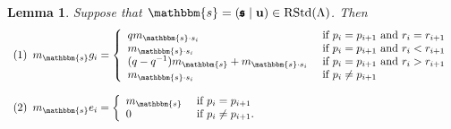 \documentclass[10pt,a4,twoside,hidelinks,rm]{article}
\newcommand\es{\mathbbm{s}}
\newcommand\bu{\mathbf{u}}
\newcommand{\Bs}{\pmb{\mathfrak{s}}}
\newcommand{\rstd}{{\rm RStd}}
\theoremstyle{plain}
\newtheorem{lem}[teo]{Lemma}
\begin{document}
\begin{lem}\label{descr2A}
  Suppose that $  \es = (\Bs \mid \bu ) \in \rstd(\Lambda)$. Then 
  \begin{equation}{\label{actiongiaa}}
\begin{array}{l}    
  (1) \, \, \,  m_{\es}   g_i=\left\{
\begin{array}{ll} q m_{\es \cdot s_i}    & \mbox{ if } p_i = p_{i+1} \mbox{ and } r_i = r_{i+1}   \\
  m_{\es \cdot s_i}    & \mbox{ if } p_i = p_{i+1} \mbox{ and } r_i < r_{i+1}   \\
  (q-q^{-1}) m_{\es } +  m_{\es \cdot s_i}    & \mbox{ if } p_i = p_{i+1} \mbox{ and } r_i > r_{i+1}   \\
m_{\es \cdot s_i}    & \mbox{ if } p_i \neq p_{i+1}   \\    
\end{array}\right.
  \\ \\
(2)  \, \, \,   m_{\es}   e_i=\left\{\begin{array}{ll}   m_{\es}     &\mbox{ if } p_i = p_{i+1}  \\
0        &\mbox{ if }  p_i \neq p_{i+1}.
  \end{array}\right. \end{array}
\end{equation}
  \end{lem}
\end{document}
